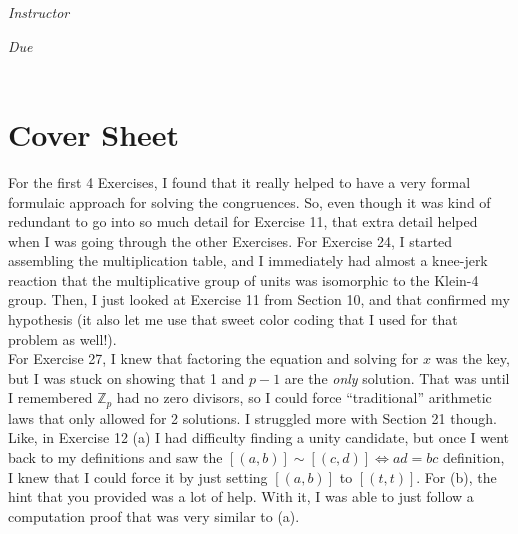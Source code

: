 \documentclass[12pt, oneside]{book}
\newcommand{\Z}{\mathbb{Z}}
\begin{document}
\begin{titlepage}
\begin{center}
\begin{large}
            \vspace*{1\baselineskip}

            \textit{Instructor} \\[1ex] %
            \professor

            \vspace*{1\baselineskip}

            \textit{Due}\\[1ex]
            {\scshape  \finaldate} \\[0.3\baselineskip] %

            \thispagestyle{empty}

        \end{large}
    \end{center}
\end{titlepage}



\section*{Cover Sheet}

For the first 4 Exercises, I found that it really helped to have a very formal formulaic approach for solving the congruences. So, even though it was kind of redundant to go into so much detail for Exercise 11, that extra detail helped when I was going through the other Exercises. For Exercise 24, I started assembling the multiplication table, and I immediately had almost a knee-jerk reaction that the multiplicative group of units was isomorphic to the Klein-4 group. Then, I just looked at Exercise 11 from Section 10, and that confirmed my hypothesis (it also let me use that sweet color coding that I used for that problem as well!).\\ 

For Exercise 27, I knew that factoring the equation and solving for \(x\) was the key, but I was stuck on showing that 1 and \(p - 1\) are the \textit{only} solution. That was until I remembered \(\Z_{p}\) had no zero divisors, so I could force ``traditional'' arithmetic laws that only allowed for 2 solutions. I struggled more with Section 21 though. Like, in Exercise 12 (a) I had difficulty finding a unity candidate, but once I went back to my definitions and saw the \([(a,b)] \sim [(c,d)] \iff ad = bc\) definition, I knew that I could force it by just setting \([(a,b)]\) to \([(t,t)]\). For (b), the hint that you provided was a lot of help. With it, I was able to just follow a computation proof that was very similar to (a).
\end{document}
